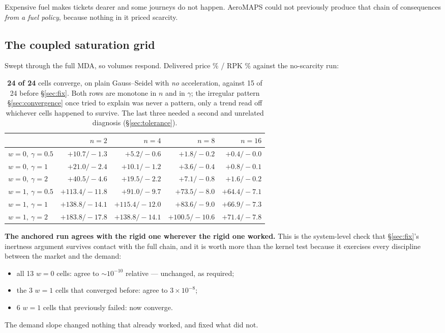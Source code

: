 \documentclass[11pt,a4paper]{article}
\begin{document}
\noindent Expensive fuel makes tickets dearer and some journeys do not happen. AeroMAPS
could not previously produce that chain of consequences \emph{from a fuel policy},
because nothing in it priced scarcity.

\subsection{The coupled saturation grid}
\label{sec:coupledgrid}

Swept through the full MDA, so volumes respond. Delivered price \% / RPK \% against the
no-scarcity run:

\begin{table}[h]
\centering\small
\begin{tabular}{@{}lrrrr@{}}
\toprule
 & $n=2$ & $n=4$ & $n=8$ & $n=16$ \\
\midrule
$w=0,\ \gamma=0.5$ & $+10.7 / -1.3$ & $+5.2 / -0.6$ & $+1.8 / -0.2$ & $+0.4 / -0.0$ \\
$w=0,\ \gamma=1$   & $+21.0 / -2.4$ & $+10.1 / -1.2$ & $+3.6 / -0.4$ & $+0.8 / -0.1$ \\
$w=0,\ \gamma=2$   & $+40.5 / -4.6$ & $+19.5 / -2.2$ & $+7.1 / -0.8$ & $+1.6 / -0.2$ \\
$w=1,\ \gamma=0.5$ & $+113.4 / -11.8$ & $+91.0 / -9.7$ & $+73.5 / -8.0$ & $+64.4 / -7.1$ \\
$w=1,\ \gamma=1$   & $+138.8 / -14.1$ & $+115.4 / -12.0$ & $+83.6 / -9.0$ & $+66.9 / -7.3$ \\
$w=1,\ \gamma=2$   & $+183.8 / -17.8$ & $+138.8 / -14.1$ & $+100.5 / -10.6$ & $+71.4 / -7.8$ \\
\bottomrule
\end{tabular}
\caption{\textbf{24 of 24} cells converge, on plain Gauss--Seidel with \emph{no}
acceleration, against 15 of 24 before \S\ref{sec:fix}. Both rows are monotone in $n$ and
in $\gamma$; the irregular pattern \S\ref{sec:convergence} once tried to explain was
never a pattern, only a trend read off whichever cells happened to survive. The last
three needed a second and unrelated diagnosis (\S\ref{sec:tolerance}).}
\end{table}

\begin{keybox}
\textbf{The anchored run agrees with the rigid one wherever the rigid one worked.} This
is the system-level check that \S\ref{sec:fix}'s inertness argument survives contact with
the full chain, and it is worth more than the kernel test because it exercises every
discipline between the market and the demand:
\begin{itemize}[nosep,leftmargin=5mm]
  \item all 13 $w=0$ cells: agree to $\sim 10^{-10}$ relative --- unchanged, as required;
  \item the 3 $w=1$ cells that converged before: agree to $3\times10^{-8}$;
  \item 6 $w=1$ cells that previously failed: now converge.
\end{itemize}
The demand slope changed nothing that already worked, and fixed what did not.
\end{keybox}
\end{document}

